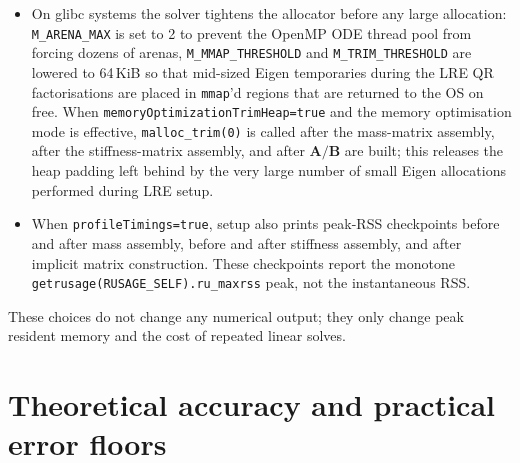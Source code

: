 \documentclass[11pt,a4paper]{article}
\newcommand{\code}[1]{\texttt{\small #1}}
\newcommand{\Kstif}{\mathbf{K}}
\newcommand{\Aimp}{\mathbf{A}}
\newcommand{\Bimp}{\mathbf{B}}
\begin{document}
\begin{itemize}
$\Kstif\mathsf{V}+\mathsf{b}$. The expensive
\code{computeHighOrderLaplacian} path that fills \code{fluxVm\_HO} is only run
when an output time needs the flux field, and once more during final
post-processing.
\item On glibc systems the solver tightens the allocator before any large
allocation: \code{M\_ARENA\_MAX} is set to 2 to prevent the OpenMP ODE thread
pool from forcing dozens of arenas, \code{M\_MMAP\_THRESHOLD} and
\code{M\_TRIM\_THRESHOLD} are lowered to 64\,KiB so that mid-sized Eigen
temporaries during the LRE QR factorisations are placed in \code{mmap}'d
regions that are returned to the OS on free. When
\code{memoryOptimizationTrimHeap=true} and the memory optimisation mode is
effective, \code{malloc\_trim(0)} is called after the mass-matrix assembly,
after the stiffness-matrix assembly, and after $\Aimp/\Bimp$ are built; this
releases the heap padding left behind by the very large number of small Eigen
allocations performed during LRE setup.
\item When \code{profileTimings=true}, setup also prints peak-RSS checkpoints
before and after mass assembly, before and after stiffness assembly, and after
implicit matrix construction. These checkpoints report the monotone
\code{getrusage(RUSAGE\_SELF).ru\_maxrss} peak, not the instantaneous RSS.
\end{itemize}
These choices do not change any numerical output; they only change peak
resident memory and the cost of repeated linear solves.

\section{Theoretical accuracy and practical error floors}
\end{document}
